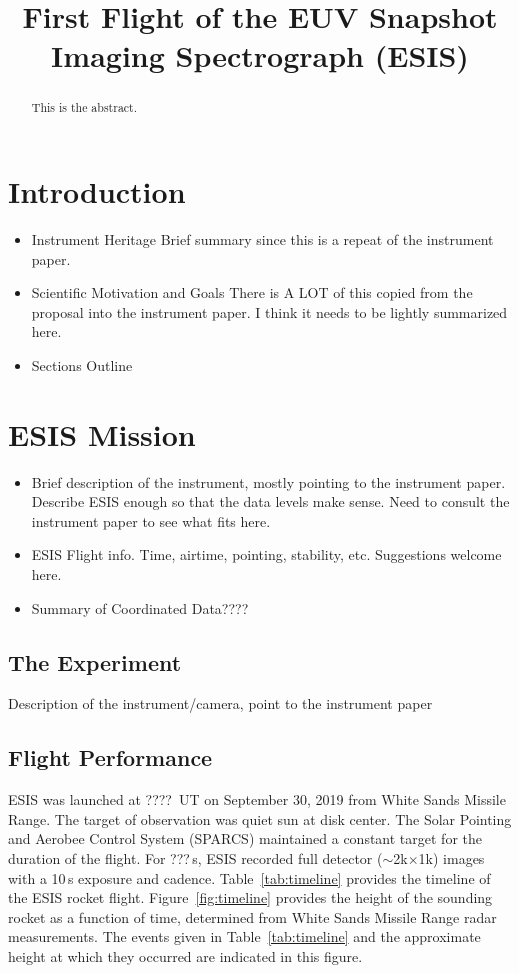 \title{First Flight of the EUV Snapshot Imaging Spectrograph (ESIS)}

\begin{abstract}
    This is the abstract.
\end{abstract} 

\section{Introduction}
    \begin{itemize}
        \item Instrument Heritage
            Brief summary since this is a repeat of the instrument paper.
        \item Scientific Motivation and Goals
            There is A LOT of this copied from the proposal into the instrument paper.  I think it needs to be lightly summarized here.
        \item Sections Outline
    \end{itemize}
    

\section{ESIS Mission}
    \begin{itemize}
        \item Brief description of the instrument, mostly pointing to the instrument paper.  Describe ESIS enough so that the data levels make sense. Need to consult the instrument paper to see what fits here. 
        \item ESIS Flight info.  Time, airtime, pointing, stability, etc.  Suggestions welcome here.
        \item Summary of Coordinated Data????
    \end{itemize}
    
\subsection{The Experiment}
Description of the instrument/camera, point to the instrument paper
    
\subsection{Flight Performance} \label{sec:flt}

ESIS was launched at ????~UT on September 30, 2019 from White Sands Missile Range.  The target of observation was quiet sun at disk center.  The Solar Pointing and Aerobee Control System (SPARCS) maintained a constant target for the duration of the flight.  For ???\,s, ESIS recorded full detector ($\sim$2k$\times$1k) images with a 10\,s exposure and cadence. %
Table~\ref{tab:timeline} provides the timeline of the ESIS rocket flight. Figure~\ref{fig:timeline} provides the height of the sounding rocket as a function of time, determined from White Sands Missile Range radar measurements.  The events given in Table~\ref{tab:timeline} and the approximate height at which they occurred are indicated in this figure.

